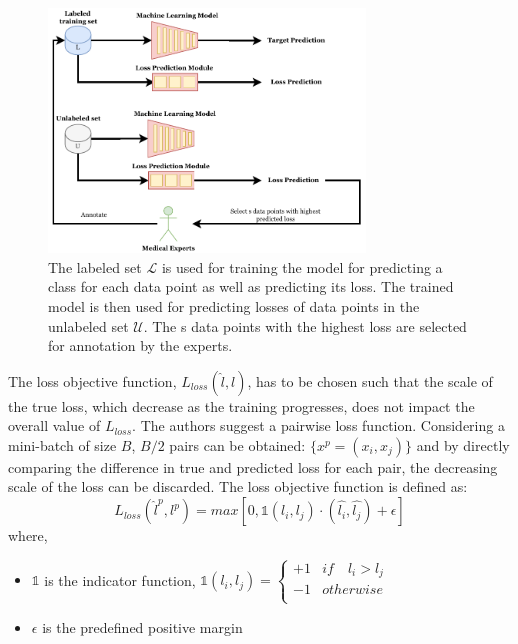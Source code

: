 \begin{figure}[htbp]
\centering
\captionsetup{format=plain}
\includegraphics[keepaspectratio,width=0.75\textwidth]{figures/fig_learning_loss_for_active_learning.pdf}
\caption{The labeled set $\mathcal{L}$ is used for training the model for predicting a class for each data point as well as predicting its loss. The trained model is then used for predicting losses of data points in the unlabeled set $\mathcal{U}$. The s data points with the highest loss are selected for annotation by the experts.}
\label{fig:learning_loss_for_active_learning}
\end{figure}

The loss objective function, $L_{loss}(\hat{l}, l)$, has to be chosen such that the scale of the true loss, which decrease as the training progresses, does not impact the overall value of $L_{loss}$. The authors suggest a pairwise loss function. Considering a mini-batch of size $B$, $B/2$ pairs can be obtained: $\{x^p = (x_i, x_j)\}$ and by directly comparing the difference in true and predicted loss for each pair, the decreasing scale of the loss can be discarded. The loss objective function is defined as:
\begin{equation}
    \label{equation:learning_loss_pair_wise_loss}
    L_{loss}(\hat{l}^{p}, l^{p}) = max [0, \mathbb{1}(l_i, l_j)\cdot(\hat{l_i}, \hat{l_j}) + \epsilon ]
\end{equation}
where,
\begin{itemize}[label={}]
  \setlength\itemsep{0em}
  \item $\mathbb{1}$ is the indicator function, $\mathbb{1}(l_i, l_j) = \begin{cases} 
      +1 & if \quad l_i > l_j \\
      -1 & otherwise \\
   \end{cases}$
   \item $\epsilon$ is the predefined positive margin
\end{itemize}

